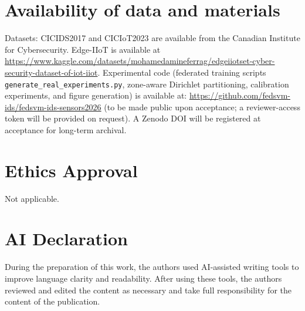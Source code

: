 \documentclass[sensors,article,submit,pdftex,moreauthors]{Definitions/mdpi}
\begin{document}
\section*{Availability of data and materials} Datasets: CICIDS2017 and CICIoT2023 are available from the Canadian Institute for Cybersecurity. Edge-IIoT is available at \url{https://www.kaggle.com/datasets/mohamedamineferrag/edgeiiotset-cyber-security-dataset-of-iot-iiot}. Experimental code (federated training scripts \texttt{generate\_real\_experiments.py}, zone-aware Dirichlet partitioning, calibration experiments, and figure generation) is available at: \url{https://github.com/fedsvm-ids/fedsvm-ids-sensors2026} (to be made public upon acceptance; a reviewer-access token will be provided on request). A Zenodo DOI will be registered at acceptance for long-term archival.

\section*{Ethics Approval} Not applicable.



\section*{AI Declaration} During the preparation of this work, the authors used AI-assisted writing tools to improve language clarity and readability. After using these tools, the authors reviewed and edited the content as necessary and take full responsibility for the content of the publication.

\FloatBarrier

\end{document}
